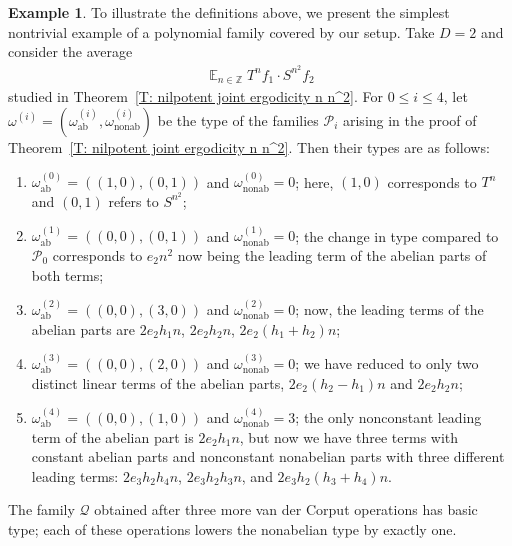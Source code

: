 \documentclass[11pt]{amsart}
\theoremstyle{definition}
\newtheorem{example}[lemma]{Example}
\DeclareMathOperator*{\E}{\mathbb{E}}
\newcommand{\Z}{{\mathbb Z}}
\newcommand{\CP}{{\mathcal P}}
\newcommand{\CQ}{{\mathcal Q}}
\newcommand{\1}{{\mathbf{1}}}
\newcommand{\ab}{{\mathrm{ab}}}
\newcommand{\nab}{{\mathrm{nonab}}}
\newcommand{\nonab}{{\mathrm{nonab}}}
\begin{document}
\begin{example}\label{Ex: nilpotent PET type}
    To illustrate the definitions above, we present the simplest nontrivial example of a polynomial family covered by our setup. Take $D=2$ and consider 
    the average
    \begin{align*}
        \E_{n\in\Z}T^n f_1\cdot S^{n^2}f_2
    \end{align*}
    studied in Theorem~\ref{T: nilpotent joint ergodicity n n^2}. For $0\leq i\leq 4$, let $\omega^{(i)} = (\omega^{(i)}_\ab, \omega^{(i)}_\nonab)$ be the type of the families $\CP_i$ arising in the proof of Theorem~\ref{T: nilpotent joint ergodicity n n^2}. Then their types are as follows:
    \begin{enumerate}
        \item $\omega^{(0)}_\ab = ((1,0), (0,1))$ and $\omega^{(0)}_\nab = 0$; here, $(1,0)$ corresponds to $T^n$ and $(0,1)$ refers to $S^{n^2}$;
        \item $\omega^{(1)}_\ab = ((0,0), (0,1))$ and $\omega^{(1)}_\nab = 0$; the change in type compared to $\CP_0$ corresponds to $e_2 n^2$ now being the leading term of the abelian parts of both terms;
        \item $\omega^{(2)}_\ab = ((0,0), (3,0))$ and $\omega^{(2)}_\nab = 0$; now, the leading terms of the abelian parts are $2e_2 h_1 n$, $2e_2 h_2 n$, $2e_2 (h_1+h_2)n$;
        \item $\omega^{(3)}_\ab = ((0,0), (2,0))$ and $\omega^{(3)}_\nab = 0$; we have reduced to only two distinct linear terms of the abelian parts, $2e_2(h_2-h_1)n$ and $2e_2h_2n$;
        \item $\omega^{(4)}_\ab = ((0,0), (1,0))$ and $\omega^{(4)}_\nab = 3$; the only nonconstant leading term of the abelian part is $2e_2 h_1 n$, but now we have three terms with constant abelian parts and nonconstant nonabelian parts with three different leading terms: $2e_3h_2h_4n$, $2e_3h_2h_3n$, and $2e_3h_2(h_3+h_4)n$.
    \end{enumerate}
    The family $\CQ$ obtained after three more van der Corput operations has basic type; each of these operations lowers the nonabelian type by exactly one. 
\end{example}
\end{document}
